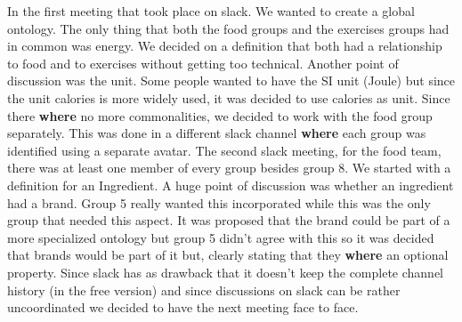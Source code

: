 In the first meeting that took place on slack. We wanted to create a global ontology. The only thing that both the food groups and the exercises groups had in common was energy. We decided on a definition that both had a relationship to food and to exercises without getting too technical. Another point of discussion was the unit. Some people wanted to have the SI unit (Joule) but since the unit calories is more widely used, it was decided to use calories as unit. Since there \textbf{where} no more commonalities, we decided to work with the food group separately. This was done in a different slack channel \textbf{where} each group was identified using a separate avatar. 
\newline
\newline
\noindent
The second slack meeting, for the food team, there was at least one member of every group besides group 8. We started with a definition for an Ingredient. A huge point of discussion was whether an ingredient had a brand. Group 5 really wanted this incorporated while this was the only group that needed this aspect. It was proposed that the brand could be part of a more specialized ontology but group 5 didn't agree with this so it was decided that brands would be part of it but, clearly stating that they \textbf{where} an optional property. Since slack has as drawback that it doesn't keep the complete channel history (in the free version) and since discussions on slack can be rather uncoordinated we decided to have the next meeting face to face. 
\newline
\newline
\noindent
